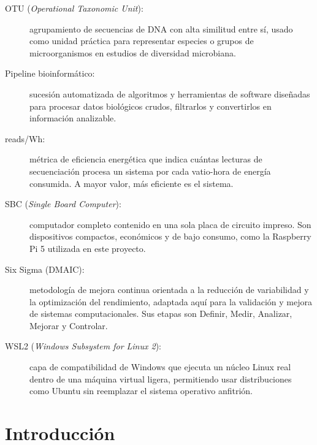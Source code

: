 \documentclass[12pt,oneside,spanish]{book}
\begin{document}
\begin{description}
        \item[OTU (\textit{Operational Taxonomic Unit}):] agrupamiento de secuencias de DNA con alta similitud entre sí, usado como unidad práctica para representar especies o grupos de microorganismos en estudios de diversidad microbiana.
        
        \item[Pipeline bioinformático:] sucesión automatizada de algoritmos y herramientas de software diseñadas para procesar datos biológicos crudos, filtrarlos y convertirlos en información analizable.
        
        \item[reads/Wh:] métrica de eficiencia energética que indica cuántas lecturas de secuenciación procesa un sistema por cada vatio-hora de energía consumida. A mayor valor, más eficiente es el sistema.
        
        \item[SBC (\textit{Single Board Computer}):] computador completo contenido en una sola placa de circuito impreso. Son dispositivos compactos, económicos y de bajo consumo, como la Raspberry Pi 5 utilizada en este proyecto.
        
        \item[Six Sigma (DMAIC):] metodología de mejora continua orientada a la reducción de variabilidad y la optimización del rendimiento, adaptada aquí para la validación y mejora de sistemas computacionales. Sus etapas son Definir, Medir, Analizar, Mejorar y Controlar.
        
        \item[WSL2 (\textit{Windows Subsystem for Linux 2}):] capa de compatibilidad de Windows que ejecuta un núcleo Linux real dentro de una máquina virtual ligera, permitiendo usar distribuciones como Ubuntu sin reemplazar el sistema operativo anfitrión.
    \end{description}
    
    
    \chapter*{Introducción}
    \setcounter{chapter}{0}
    \setcounter{equation}{0}
    \setcounter{figure}{0}
    \setcounter{table}{0}
    \setcounter{secnumdepth}{4} 
    \setcounter{tocdepth}{4}
    
\end{document}
